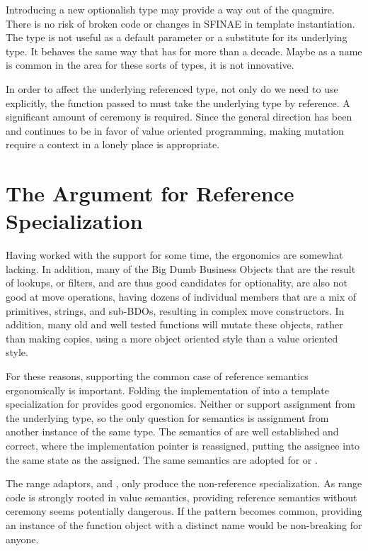 \documentclass[a4paper,10pt,oneside,openany,final,article]{memoir}
\begin{document}
Introducing a new optionalish type may provide a way out of the  quagmire. There is no risk of broken code or changes in SFINAE in template instantiation. The type  is not useful as a default parameter or a substitute for its underlying type. It behaves the same way that  has for more than a decade. Maybe as a name is common in the area for these sorts of types, it is not innovative.

In order to affect the underlying referenced type, not only do we need to use  explicitly, the function passed to  must take the underlying type by reference. A significant amount of ceremony is required. Since the general direction has been and continues to be in favor of value oriented programming, making mutation require a context in a lonely place is appropriate.

\section{The Argument for Reference Specialization}
Having worked with the  support for some time, the ergonomics are somewhat lacking. In addition, many of the Big Dumb Business Objects that are the result of lookups, or filters, and are thus good candidates for optionality, are also not good at move operations, having dozens of individual members that are a mix of primitives, strings, and sub-BDOs, resulting in complex move constructors. In addition, many old and well tested functions will mutate these objects, rather than making copies, using a more object oriented style than a value oriented style.

For these reasons, supporting the common case of reference semantics ergonomically is important. Folding the implementation of  into a template specialization for  provides good ergonomics. Neither  or  support assignment from the underlying type, so the only question for semantics is assignment from another instance of the same type. The semantics of  are well established and correct, where the implementation pointer is reassigned, putting the assignee into the same state as the assigned. The same semantics are adopted for  or .

The range adaptors,  and , only produce the non-reference specialization. As range code is strongly rooted in value semantics, providing reference semantics without ceremony seems potentially dangerous. If the pattern becomes common, providing an instance of the function object with a distinct name would be non-breaking for anyone.
\end{document}
